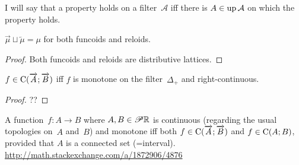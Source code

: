 
I will say that a property holds on a filter~$\mathcal{A}$ iff there is $A\in\operatorname{up}\mathcal{A}$ on which the property holds.

\begin{prop}
$\overrightarrow{\mu} \sqcup \overleftarrow{\mu} = \mu$ for both funcoids and reloids.
\end{prop}

\begin{proof}
Both funcoids and reloids are distributive lattices.
\end{proof}

\begin{prop}
$f\in\mathrm{C}(\overrightarrow{A};\overrightarrow{B})$ iff
$f$ is monotone on the filter~$\Delta_+$ and right-continuous.
\end{prop}

\begin{proof}
??
\end{proof}

\begin{conjecture}
A function~$f:A\rightarrow B$ where $A,B\in\mathscr{P}\mathbb{R}$ is continuous (regarding the usual topologies on~$A$ and~$B$) and monotone iff
both $f\in\mathrm{C}(\overrightarrow{A};\overrightarrow{B})$ and $f\in\mathrm{C}(A;B)$, provided that $A$ is a connected set (=interval).
\url{http://math.stackexchange.com/a/1872906/4876}
\end{conjecture}


